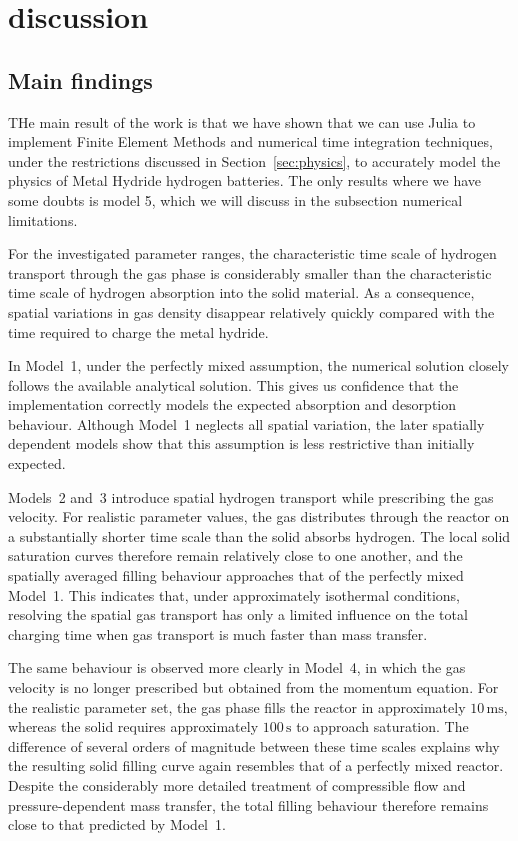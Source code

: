 \section{discussion}\label{sec:discussion}
\subsection{Main findings}

THe main result of the work is that we have shown that we can use Julia to implement Finite Element Methods and numerical time integration techniques, under the restrictions discussed in Section~\ref{sec:physics}, to accurately model the physics of Metal Hydride hydrogen batteries. The only results where we have some doubts is model 5, which we will discuss in the subsection numerical limitations.

For the investigated parameter ranges, the characteristic time scale of hydrogen transport through the gas phase is considerably smaller than the characteristic time scale of hydrogen absorption into the solid material. As a consequence, spatial variations in gas density disappear relatively quickly compared with the time required to charge the metal hydride.

In Model~1, under the perfectly mixed assumption, the numerical solution closely follows the available analytical solution. This gives us confidence that the implementation correctly models the expected absorption and desorption behaviour. Although Model~1 neglects all spatial variation, the later spatially dependent models show that this assumption is less restrictive than initially expected.

Models~2 and~3 introduce spatial hydrogen transport while prescribing the gas velocity. For realistic parameter values, the gas distributes through the reactor on a substantially shorter time scale than the solid absorbs hydrogen. The local solid saturation curves therefore remain relatively close to one another, and the spatially averaged filling behaviour approaches that of the perfectly mixed Model~1. This indicates that, under approximately isothermal conditions, resolving the spatial gas transport has only a limited influence on the total charging time when gas transport is much faster than mass transfer.

The same behaviour is observed more clearly in Model~4, in which the gas velocity is no longer prescribed but obtained from the momentum equation. For the realistic parameter set, the gas phase fills the reactor in approximately $10\,\mathrm{ms}$, whereas the solid requires approximately $100\,\mathrm{s}$ to approach saturation. The difference of several orders of magnitude between these time scales explains why the resulting solid filling curve again resembles that of a perfectly mixed reactor. Despite the considerably more detailed treatment of compressible flow and pressure-dependent mass transfer, the total filling behaviour therefore remains close to that predicted by Model~1.

